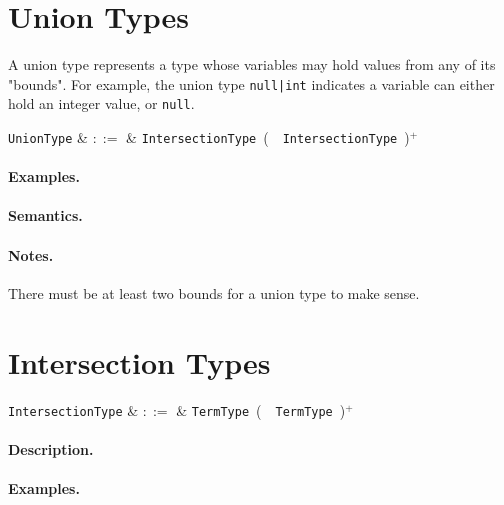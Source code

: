 \section{Union Types}

A union type represents a type whose variables may hold values from any of its "bounds". For example, the union type \lstinline{null|int} indicates a variable can either hold an integer value, or \lstinline{null}. 

\begin{syntax}
  \verb+UnionType+ & $::=$ & \verb+IntersectionType+\ \big(\ \token{|}\ \verb+IntersectionType+\
  \big)$^+$\\
\end{syntax}

\paragraph{Examples.}

\paragraph{Semantics.}

\paragraph{Notes.}  There must be at least two bounds for a union type to make sense.


\section{Intersection Types}

\begin{syntax}
  \verb+IntersectionType+ & $::=$ & \verb+TermType+\ \big(\ \token{\&}\ \verb+TermType+\
  \big)$^+$\\
\end{syntax}

\paragraph{Description.}

\paragraph{Examples.}

